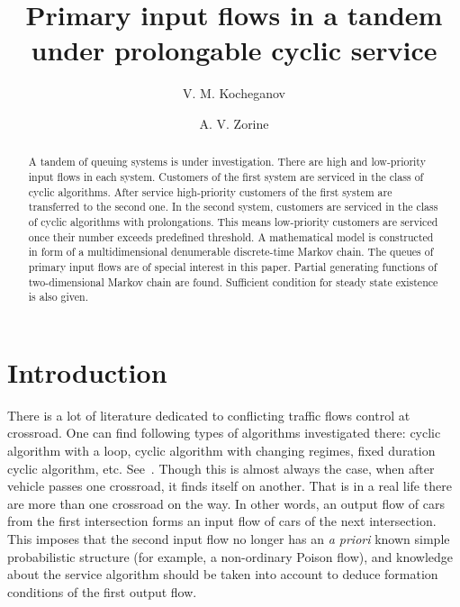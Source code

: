 \documentclass[60x84/16,10pt]{dccn}
\begin{document}
{


\title{Primary input flows in a tandem under prolongable cyclic service}

\author[1]{V. M. Kocheganov}
\author[1]{A. V. Zorine}

\address[1]{
N.I. Lobachevsky National Research\\  State University of Nizhny Novgorod\\
Gagarina av. 23, Nizhny Novgorod, 603950, Russia}

\begin{abstract}
 A tandem of queuing systems is under investigation. There are high and low-priority input flows in each system. Customers of the first system are serviced in the class of cyclic algorithms. After service high-priority customers of the first system are transferred to the second one. In the second system, customers are serviced in the class of cyclic algorithms with prolongations. This means low-priority customers are serviced once their number exceeds predefined threshold. A mathematical model is constructed in form of a multidimensional denumerable discrete-time Markov chain. The queues of primary input flows are of special interest in this paper. Partial generating functions of two-dimensional Markov chain are found. Sufficient condition for steady state existence is also given.
\end{abstract}

{\sloppy
{}
}


\maketitle 

\section{Introduction}
\label{sec:intro}
There is a lot of literature dedicated to conflicting traffic flows control at crossroad. One can find following types of algorithms investigated there: cyclic algorithm with a loop, cyclic algorithm with changing regimes, fixed duration cyclic algorithm, etc. See~\cite{n:f:p:1968,f:1977,l:f:2000,p:f:2008,a:b:2010}. Though this is almost always the case, when after vehicle passes one crossroad, it finds itself on another. That is in a real life there are more than one crossroad on the way. In other words, an output flow of cars from
the first intersection forms an input flow of cars of the next intersection. This imposes that the second input flow
no longer has an \textit{a priori} known simple probabilistic structure (for example, a
non-ordinary Poison flow), and knowledge about the service algorithm should be taken into account to deduce formation conditions of the first output flow.

}
\end{document}

